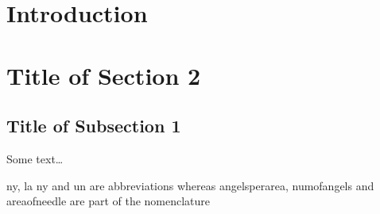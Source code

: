 \newpage
\section{Introduction}


\newpage
\section{Title of Section 2} 


\subsection{Title of Subsection 1}

Some text\ldots~\cite[1-2]{traeinfo}

\ac{ny}, \ac{la} \ac{ny} and \ac{un} are abbreviations whereas
\ac{angelsperarea}, \ac{numofangels} and \ac{areaofneedle} are part of the
nomenclature

